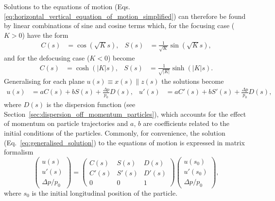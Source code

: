 \documentclass[../main.tex]{subfiles}
\begin{document}
Solutions to the equations of motion (Eqs.~ \ref{eq:horizontal_vertical_equation_of_motion_simplified}) can therefore be found by linear combinations of sine and cosine terms which, for the focusing case ($K>0$) have the form
\begin{align}
C\left(s\right) &= \cos\left(\sqrt{K}s\right), &
S\left(s\right) &= \frac{1}{\sqrt{K}}\sin\left(\sqrt{K}s\right),
\label{eq:focusing_solution_equation_of_motion}
\end{align}
and for the defocusing case ($K<0$) become
\begin{align}
C\left(s\right) &= \cosh\left(\left|K\right|s\right), &
S\left(s\right) &= \frac{1}{\sqrt{\left|K\right|}}\sinh\left(\left|K\right|s\right).
\label{eq:defocusing_solution_equation_of_motion}    
\end{align}
Generalising for each plane $u\left(s\right)\equiv x\left(s\right) \parallel z\left(s\right)$ the solutions become
\begin{align}
u\left(s\right) &= aC\left(s\right) + bS\left(s\right) + \frac{\Delta p}{p_{0}}D\left(s\right), &
u'\left(s\right) &= aC'\left(s\right) + bS'\left(s\right) + \frac{\Delta p}{p_{0}}D\left(s\right),
\label{eq:generalised_solution}
\end{align}
where $D\left(s\right)$ is the dispersion function (see Section~\ref{sec:dispersion_off_momentum_particles}), which accounts for the effect of momentum on particle trajectories and $a$, $b$ are coefficients related to the initial conditions of the particles. Commonly, for convenience, the solution (Eq.~\ref{eq:generalised_solution}) to the equations of motion is expressed in matrix formalism
\begin{equation}
\begin{pmatrix}
u\left(s\right) \\
u'\left(s\right) \\
\Delta p/p_{0}
\end{pmatrix} = 
\begin{pmatrix}
C\left(s\right) & S\left(s\right) & D\left(s\right) \\
C'\left(s\right) & S'\left(s\right) & D'\left(s\right) \\
0 & 0 & 1
\end{pmatrix}
\begin{pmatrix}
u\left(s_{0}\right) \\
u'\left(s_{0}\right) \\
\Delta p/p_{0}
\end{pmatrix},
\label{eq:general_solution_matrix}    
\end{equation}
where $s_{0}$ is the initial longitudinal position of the particle.
\end{document}
